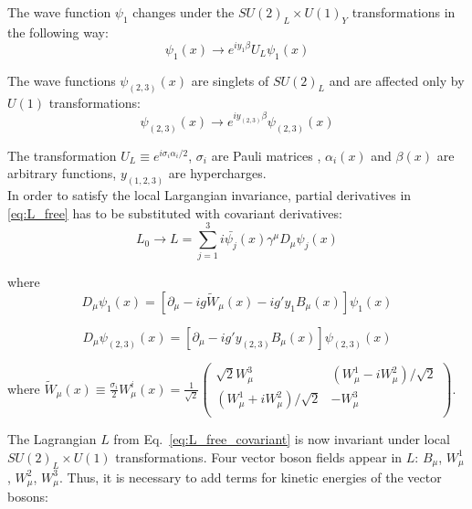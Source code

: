 The wave function $\psi_1$ changes under the $SU(2)_L \times U(1)_Y$ transformations in the following way:\\

\begin{equation}
\psi_1(x) \rightarrow e^{i y_1 \beta} U_L \psi_1(x)
\end{equation}


The wave functions $\psi_{(2,3)}(x)$ are singlets of $SU(2)_L$ and are affected only by $U(1)$ transformations:\\

\begin{equation}
\psi_{(2,3)}(x) \rightarrow e^{i y_{(2,3)} \beta} \psi_{(2,3)}(x)
\end{equation}

The transformation $U_L \equiv e^{i \sigma_i \alpha_i /2}$, $\sigma_i$ are Pauli matrices \cite{ref_Griffiths}, $\alpha_i(x)$ and $\beta(x)$ are arbitrary functions, $y_{(1,2,3)}$ are hypercharges.\\

In order to satisfy the local Largangian invariance, partial derivatives in \ref{eq:L_free} has to be substituted with covariant derivatives:\\

\begin{equation}\label{eq:L_free_covariant}
L_0 \rightarrow L = \sum_{j=1}^{3} i \bar{\psi_j}(x) \gamma^\mu D_\mu \psi_j(x) 
\end{equation}

where\\

\begin{equation}
D_\mu \psi_1(x) = [\partial_\mu - i g {\tilde{W}}_\mu(x) - i g' y_1 B_\mu(x) ] \psi_1(x) 
\end{equation}

\begin{equation}
D_\mu \psi_{(2,3)}(x) = [\partial_\mu - i g' y_{(2,3)} B_\mu(x) ] \psi_{(2,3)}(x) 
\end{equation}

where ${\tilde{W}}_\mu(x) \equiv \frac{\sigma_i}{2} W_\mu^i(x) = \frac{1}{\sqrt{2}} 
\begin{pmatrix}
\sqrt{2} W_\mu^3 & (W_\mu^1 - i W_\mu^2)/{\sqrt{2}}\\
(W_\mu^1 + i W_\mu^2)/{\sqrt{2}} & -W_\mu^3\\
\end{pmatrix}$.

The Lagrangian $L$ from Eq.~\ref{eq:L_free_covariant} is now invariant under local $SU(2)_L \times U(1)$ transformations. Four vector boson fields appear in $L$: $B_\mu$, $W_\mu^1$, $W_\mu^2$, $W_\mu^3$.  Thus, it is necessary to add terms for kinetic energies of the vector bosons:\\

